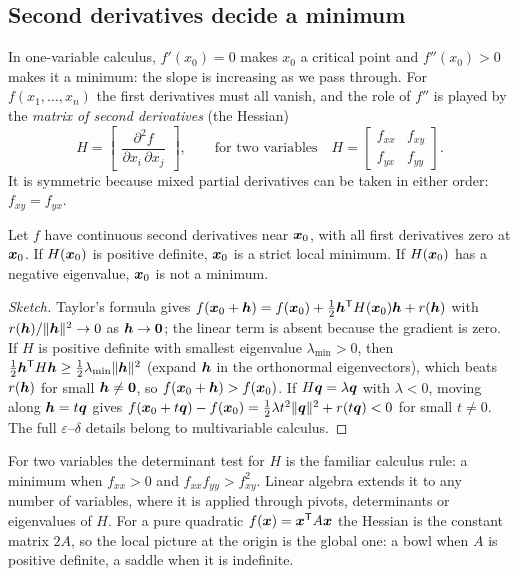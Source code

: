 \subsection{Second derivatives decide a minimum}

In one-variable calculus, $f'(x_0)=0$ makes $x_0$ a critical point and $f''(x_0)>0$ makes it a
minimum: the slope is increasing as we pass through. For $f(x_1,\dots,x_n)$ the first
derivatives must all vanish, and the role of $f''$ is played by the \emph{matrix of second
derivatives} (the Hessian)
\[
  H=\begin{bmatrix}\dfrac{\partial^2f}{\partial x_i\,\partial x_j}\end{bmatrix},
  \qquad\text{for two variables}\quad
  H=\begin{bmatrix}f_{xx}&f_{xy}\\f_{yx}&f_{yy}\end{bmatrix}.
\]
It is symmetric because mixed partial derivatives can be taken in either order: $f_{xy}=f_{yx}$.

\begin{proposition}\label{prop:u31-hessian}
Let $f$ have continuous second derivatives near $\boldsymbol{x}_0$, with all first derivatives zero at
$\boldsymbol{x}_0$. If $H(\boldsymbol{x}_0)$ is positive definite, $\boldsymbol{x}_0$ is a strict local minimum. If
$H(\boldsymbol{x}_0)$ has a negative eigenvalue, $\boldsymbol{x}_0$ is not a minimum.
\end{proposition}
\begin{proof}[Sketch]
Taylor's formula gives $f(\boldsymbol{x}_0+\boldsymbol{h})=f(\boldsymbol{x}_0)+\tfrac12\boldsymbol{h}^{\mathsf{T}} H(\boldsymbol{x}_0)\boldsymbol{h}+r(\boldsymbol{h})$ with
$r(\boldsymbol{h})/\|\boldsymbol{h}\|^2\to0$ as $\boldsymbol{h}\to\boldsymbol{0}$; the linear term is absent because the gradient is zero.
If $H$ is positive definite with smallest eigenvalue $\lambda_{\min}>0$, then
$\tfrac12\boldsymbol{h}^{\mathsf{T}} H\boldsymbol{h}\ge\tfrac12\lambda_{\min}\|\boldsymbol{h}\|^2$ (expand $\boldsymbol{h}$ in the orthonormal
eigenvectors), which beats $r(\boldsymbol{h})$ for small $\boldsymbol{h}\ne\boldsymbol{0}$, so $f(\boldsymbol{x}_0+\boldsymbol{h})>f(\boldsymbol{x}_0)$. If
$H\boldsymbol{q}=\lambda\boldsymbol{q}$ with $\lambda<0$, moving along $\boldsymbol{h}=t\boldsymbol{q}$ gives
$f(\boldsymbol{x}_0+t\boldsymbol{q})-f(\boldsymbol{x}_0)=\tfrac12\lambda t^2\|\boldsymbol{q}\|^2+r(t\boldsymbol{q})<0$ for small $t\ne0$.
The full $\varepsilon$--$\delta$ details belong to multivariable calculus.
\end{proof}

For two variables the determinant test for $H$ is the familiar calculus rule: a minimum when
$f_{xx}>0$ and $f_{xx}f_{yy}>f_{xy}^2$. Linear algebra extends it to any number of variables,
where it is applied through pivots, determinants or eigenvalues of $H$. For a pure quadratic
$f(\boldsymbol{x})=\boldsymbol{x}^{\mathsf{T}} A\boldsymbol{x}$ the Hessian is the constant matrix $2A$, so the local picture at the origin
is the global one: a bowl when $A$ is positive definite, a saddle when it is indefinite.

